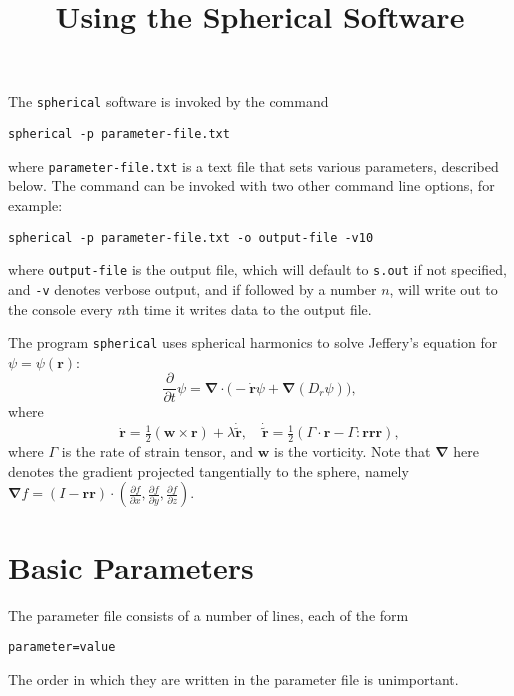 \documentclass{amsart}
\title{Using the Spherical Software}
\newcommand{\br}{{\mathbf r}}
\newcommand{\bnabla}{{\boldsymbol \nabla}}
\begin{document}
\maketitle

\noindent
The {\tt spherical} software is invoked by the command
\begin{center}
{\tt spherical -p parameter-file.txt}
\end{center}
where {\tt parameter-file.txt} is a text file that sets various parameters, described below.  The command can be invoked with two other command line options, for example:
\begin{center}
{\tt spherical -p parameter-file.txt -o output-file -v10}
\end{center}
where {\tt output-file} is the output file, which will default to {\tt s.out} if not specified, and {\tt -v} denotes verbose output, and if followed by a number $n$, will write out to the console every $n$th time it writes data to the output file.

The program {\tt spherical} uses spherical harmonics to solve Jeffery's equation \cite{jeffery} for $\psi=\psi(\br)$:
$$ \frac\partial{\partial t}\psi = \bnabla\cdot\bigl(-\dot\br \psi + \bnabla(D_r \psi)\bigr) ,$$
where
$$ \dot\br = \tfrac12(\mathbf w \times\br) + \lambda \dot{\tilde\br} ,\quad \dot{\tilde\br} = \tfrac12(\Gamma \cdot\br - \Gamma:\br\br\br) , $$
where $\Gamma$ is the rate of strain tensor, and $\mathbf w$ is the vorticity.  Note that $\bnabla$ here denotes the gradient projected tangentially to the sphere, namely $\bnabla f = (I-\br\br)\cdot(\tfrac{\partial f}{\partial x},\tfrac{\partial f}{\partial y},\tfrac{\partial f}{\partial z})$.

\section*{Basic Parameters}

\noindent
The parameter file consists of a number of lines, each of the form
\begin{center}
{\tt parameter=value}
\end{center}
The order in which they are written in the parameter file is unimportant.
\end{document}
